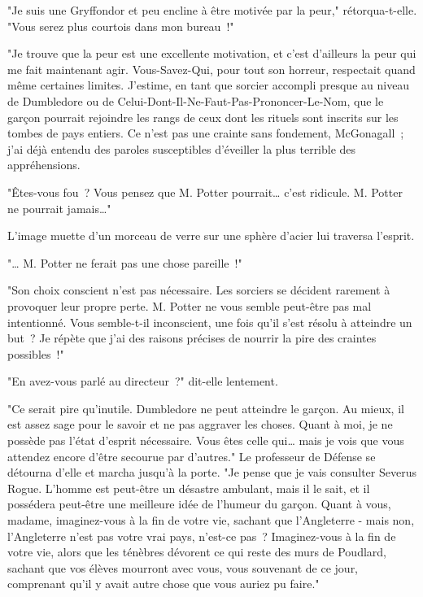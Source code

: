 "Je suis une Gryffondor et peu encline à être motivée par la peur," rétorqua-t-elle. "Vous serez plus courtois dans mon bureau~!"

"Je trouve que la peur est une excellente motivation, et c'est d'ailleurs la peur qui me fait maintenant agir. Vous-Savez-Qui, pour tout son horreur, respectait quand même certaines limites. J'estime, en tant que sorcier accompli presque au niveau de Dumbledore ou de Celui-Dont-Il-Ne-Faut-Pas-Prononcer-Le-Nom, que le garçon pourrait rejoindre les rangs de ceux dont les rituels sont inscrits sur les tombes de pays entiers. Ce n'est pas une crainte sans fondement, McGonagall~; j'ai déjà entendu des paroles susceptibles d'éveiller la plus terrible des appréhensions.

"Êtes-vous fou~? Vous pensez que M. Potter pourrait… c'est ridicule. M. Potter ne pourrait jamais…"

L'image muette d'un morceau de verre sur une sphère d'acier lui traversa l'esprit.

"… M. Potter ne ferait pas une chose pareille~!"

"Son choix conscient n'est pas nécessaire. Les sorciers se décident rarement à provoquer leur propre perte. M. Potter ne vous semble peut-être pas mal intentionné. Vous semble-t-il inconscient, une fois qu'il s'est résolu à atteindre un but~? Je répète que j'ai des raisons précises de nourrir la pire des craintes possibles~!"

"En avez-vous parlé au directeur~?" dit-elle lentement.

"Ce serait pire qu'inutile. Dumbledore ne peut atteindre le garçon. Au mieux, il est assez sage pour le savoir et ne pas aggraver les choses. Quant à moi, je ne possède pas l'état d'esprit nécessaire. Vous êtes celle qui… mais je vois que vous attendez encore d'être secourue par d'autres." Le professeur de Défense se détourna d'elle et marcha jusqu'à la porte. "Je pense que je vais consulter Severus Rogue. L'homme est peut-être un désastre ambulant, mais il le sait, et il possédera peut-être une meilleure idée de l'humeur du garçon. Quant à vous, madame, imaginez-vous à la fin de votre vie, sachant que l'Angleterre - mais non, l'Angleterre n'est pas votre vrai pays, n'est-ce pas~? Imaginez-vous à la fin de votre vie, alors que les ténèbres dévorent ce qui reste des murs de Poudlard, sachant que vos élèves mourront avec vous, vous souvenant de ce jour, comprenant qu'il y avait autre chose que vous auriez pu faire." 

